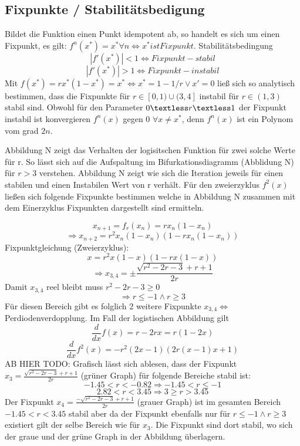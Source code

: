 \documentclass{scrartcl}
\begin{document}
\subsection{Fixpunkte / Stabilitätsbedigung}
Bildet die Funktion einen Punkt idempotent ab, so handelt es sich um einen Fixpunkt, es gilt: $f^n(x^*)=x^* \forall n \iff x^* ist Fixpunkt$. 
Stabilitätsbedingung
$$|f'(x^*)|<1 \iff Fixpunkt-stabil$$
$$|f'(x^*)|>1 \iff Fixpunkt-instabil$$ Mit
\begin{math}
f(x^*)=rx^*(1-x^*)=x^*
\iff x^*=1-1/r \vee x'=0
\end{math}
ließ sich so analytisch bestimmen, dass die Fixpunkte für $r \in [0,1) \cup (3,4]$ instabil für $r \in (1,3)$ stabil sind.
Obwohl für den Parameter $0 \textless r \textless 1$ der Fixpunkt instabil ist konvergieren $f^n(x)$ gegen 0 $\forall x \neq x^*$, denn $f^n(x)$ ist ein Polynom vom grad $2n$. 


Abbildung N zeigt das Verhalten der logisitschen Funktion für zwei solche Werte für r. So lässt sich auf die Aufspaltung im Bifurkationsdiagramm (Abblidung N) für $r>3$ verstehen. Abbildung N zeigt wie sich die Iteration jeweils für einen stabilen und einen Instabilen Wert von r verhält. Für den zweierzyklus $f^2(x)$ ließen sich folgende Fixpunkte bestimmen welche in Abbildung N zusammen mit dem Einerzyklus Fixpunkten dargestellt sind ermitteln.

$$x_{n+1}=f_r(x_n)=rx_n(1-x_n)$$
$$\Rightarrow x_{n+2}=r^2x_n(1-x_n)(1-rx_n(1-x_n))$$
\newline
Fixpunktgleichung (Zweierzyklus):
$$x=r^2x(1-x)(1-rx(1-x))$$
$$\Rightarrow x_{3,4}=\pm\frac{\sqrt{r^2-2 r-3}+r+1}{2 r}$$
Damit $x_{3,4}$ reel bleibt muss $r^2-2 r-3 \geq 0$
$$\Rightarrow r \leq -1 \land r \geq 3$$
Für diesen Bereich gibt es folglich 2 weitere Fixpunkte $x_{3,4} 
\Leftrightarrow$ Perdiodenverdopplung. 
Im Fall der logistischen Abbildung gilt
$$\frac{d}{dx}f(x)=r-2rx=r(1-2x)$$
$$\frac{d}{dx}f^2(x)=-r^2(2x-1)(2r(x-1)x+1)$$
AB HIER TODO: Grafisch lässt sich ablesen, dass der Fixpunkt $x_3=\frac{\sqrt{r^2-2 r-3}+r+1}{2 r}$ (grüner Graph) für folgende Bereiche stabil ist:
$$-1.45<r<-0.82 \Rightarrow -1.45 < r \leq -1$$
$$2.82<r<3.45 \Rightarrow 3 \geq r > 3.45$$
Der Fixpunkt $x_4=\frac{-\sqrt{r^2-2 r-3}+r+1}{2 r}$ (grauer Graph) ist im gesamten Bereich $-1.45<r<3.45$ stabil aber da der Fixpunkt ebenfalls nur für $r \leq -1 \land r \geq 3$ existiert gilt der selbe Bereich wie für $x_3$. Die Fixpunkt sind dort stabil, wo sich der graue und der grüne Graph in der Abbildung überlagern.
\end{document}
